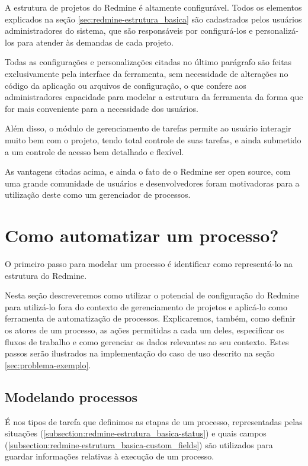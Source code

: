 A estrutura de projetos do Redmine é altamente configurável. Todos os elementos explicados na seção \ref{sec:redmine-estrutura_basica} são cadastrados pelos usuários administradores do sistema, que são responsáveis por configurá-los e personalizá-los para atender às demandas de cada projeto.

Todas as configurações e personalizações citadas no último parágrafo são feitas exclusivamente pela interface da ferramenta, sem necessidade de alterações no código da aplicação ou arquivos de configuração, o que confere aos administradores capacidade para modelar a estrutura da ferramenta da forma que for mais conveniente para a necessidade dos usuários.

Além disso, o módulo de gerenciamento de tarefas permite ao usuário interagir muito bem com o projeto, tendo total controle de suas tarefas, e ainda submetido a um controle de acesso bem detalhado e flexível.

As vantagens citadas acima, e ainda o fato de o Redmine ser open source, com uma grande comunidade de usuários e desenvolvedores foram motivadoras para a utilização deste como um gerenciador de processos.

\section{Como automatizar um processo?}\label{sec:redmine-automatizar_processo}

O primeiro passo para modelar um processo é identificar como representá-lo na estrutura do Redmine.

Nesta seção descreveremos como utilizar o potencial de configuração do Redmine para utilizá-lo fora do contexto de gerenciamento de projetos e aplicá-lo como ferramenta de automatização de processos. Explicaremos, também, como definir os atores de um processo, as ações permitidas a cada um deles, especificar os fluxos de trabalho e como gerenciar os dados relevantes ao seu contexto. Estes passos serão ilustrados na implementação do caso de uso descrito na seção \ref{sec:problema-exemplo}.


\subsection{Modelando processos}\label{subsection:redmine-automatizar_processo-criacao}

É nos tipos de tarefa que definimos as etapas de um processo, representadas pelas situações (\ref{subsection:redmine-estrutura_basica-status}) e quais campos (\ref{subsection:redmine-estrutura_basica-custom_fields}) são utilizados para guardar informações relativas à execução de um processo.

